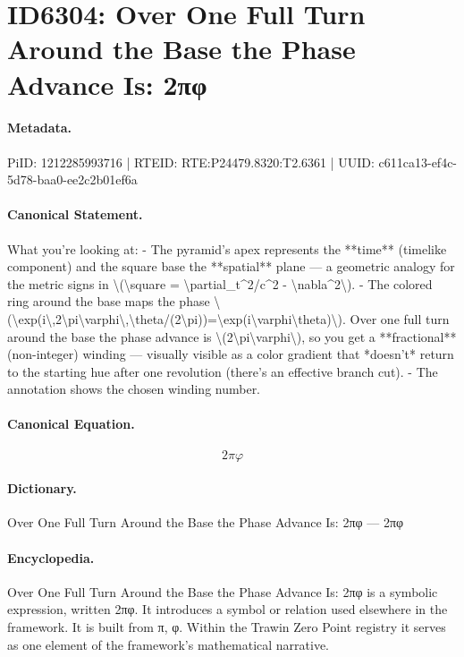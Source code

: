 \section*{ID6304: Over One Full Turn Around the Base the Phase Advance Is: 2πφ}
\paragraph{Metadata.}
PiID: 1212285993716 | RTEID: RTE:P24479.8320:T2.6361 | UUID: c611ca13-ef4c-5d78-baa0-ee2c2b01ef6a

\paragraph{Canonical Statement.}
What you’re looking at: - The pyramid’s apex represents the **time** (timelike component) and the square base the **spatial** plane — a geometric analogy for the metric signs in \textbackslash{}(\textbackslash{}square = \textbackslash{}partial\_t\textasciicircum{}2/c\textasciicircum{}2 - \textbackslash{}nabla\textasciicircum{}2\textbackslash{}). - The colored ring around the base maps the phase \textbackslash{}(\textbackslash{}exp(i\textbackslash{},2\textbackslash{}pi\textbackslash{}varphi\textbackslash{},\textbackslash{}theta/(2\textbackslash{}pi))=\textbackslash{}exp(i\textbackslash{}varphi\textbackslash{}theta)\textbackslash{}). Over one full turn around the base the phase advance is \textbackslash{}(2\textbackslash{}pi\textbackslash{}varphi\textbackslash{}), so you get a **fractional** (non-integer) winding — visually visible as a color gradient that *doesn’t* return to the starting hue after one revolution (there’s an effective branch cut). - The annotation shows the chosen winding number.

\paragraph{Canonical Equation.}
\[
2\pi\varphi
\]

\paragraph{Dictionary.}
Over One Full Turn Around the Base the Phase Advance Is: 2πφ — 2πφ

\paragraph{Encyclopedia.}
Over One Full Turn Around the Base the Phase Advance Is: 2πφ is a symbolic expression, written 2πφ. It introduces a symbol or relation used elsewhere in the framework. It is built from π, φ. Within the Trawin Zero Point registry it serves as one element of the framework's mathematical narrative.
